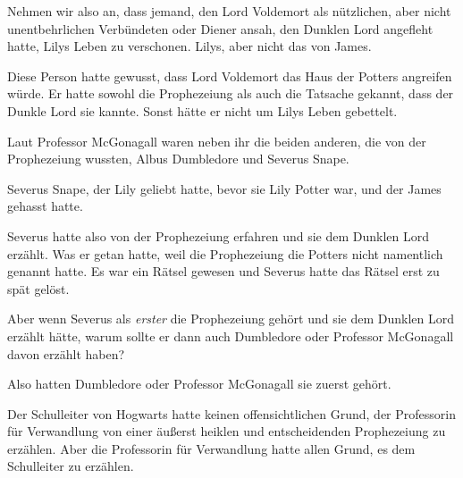 Nehmen wir also an, dass jemand, den Lord Voldemort als nützlichen, aber nicht unentbehrlichen Verbündeten oder Diener ansah, den Dunklen Lord angefleht hatte, Lilys Leben zu verschonen. Lilys, aber nicht das von James.

Diese Person hatte gewusst, dass Lord Voldemort das Haus der Potters angreifen würde. Er hatte sowohl die Prophezeiung als auch die Tatsache gekannt, dass der Dunkle Lord sie kannte. Sonst hätte er nicht um Lilys Leben gebettelt.

Laut Professor McGonagall waren neben ihr die beiden anderen, die von der Prophezeiung wussten, Albus Dumbledore und Severus Snape.

Severus Snape, der Lily geliebt hatte, bevor sie Lily Potter war, und der James gehasst hatte.

Severus hatte also von der Prophezeiung erfahren und sie dem Dunklen Lord erzählt. Was er getan hatte, weil die Prophezeiung die Potters nicht namentlich genannt hatte. Es war ein Rätsel gewesen und Severus hatte das Rätsel erst zu spät gelöst.

Aber wenn Severus als \emph{erster} die Prophezeiung gehört und sie dem Dunklen Lord erzählt hätte, warum sollte er dann auch Dumbledore oder Professor McGonagall davon erzählt haben?

Also hatten Dumbledore oder Professor McGonagall sie zuerst gehört.

Der Schulleiter von Hogwarts hatte keinen offensichtlichen Grund, der Professorin für Verwandlung von einer äußerst heiklen und entscheidenden Prophezeiung zu erzählen. Aber die Professorin für Verwandlung hatte allen Grund, es dem Schulleiter zu erzählen.

